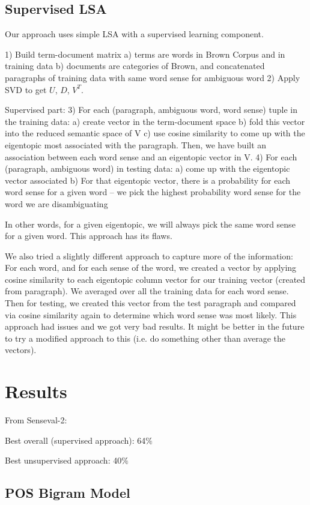 \documentclass[10pt, letterpaper]{article}
\begin{document}
	\subsection{Supervised LSA}
	Our approach uses simple LSA with a supervised learning component. 

	1) Build term-document matrix 
		a) terms are words in Brown Corpus and in training data
		b) documents are categories of Brown, and concatenated paragraphs of training data with same word sense for ambiguous word
	2) Apply SVD to get $U$, $D$, $V^T$.

	Supervised part: 
	3) For each (paragraph, ambiguous word, word sense) tuple in the training data:
		a) create vector in the term-document space
		b) fold this vector into the reduced semantic space of V
		c) use cosine similarity to come up with the eigentopic most associated with the paragraph. 
	Then, we have built an association between each word sense and an eigentopic vector in V. 
	4) For each (paragraph, ambiguous word) in testing data:
		a) come up with the eigentopic vector associated
		b) For that eigentopic vector, there is a probability for each word sense for a given word -- we pick the highest probability word sense for the word we are disambiguating

	In other words, for a given eigentopic, we will always pick the same word sense for a given word. This approach has its flaws.

	We also tried a slightly different approach to capture more of the information: For each word, and for each sense of the word, we created a vector by applying cosine similarity to each eigentopic column vector for our training vector (created from paragraph). We averaged over all the training data for each word sense. Then for testing, we created this vector from the test paragraph and compared via cosine similarity again to determine which word sense was most likely. 
	This approach had issues and we got very bad results. 
	It might be better in the future to try a modified approach to this (i.e. do something other than average the vectors).

	\section{Results}
	From Senseval-2:

	Best overall (supervised approach): 64$\%$	

	Best unsupervised approach: 40$\%$

	\subsection{POS Bigram Model}
\end{document}
